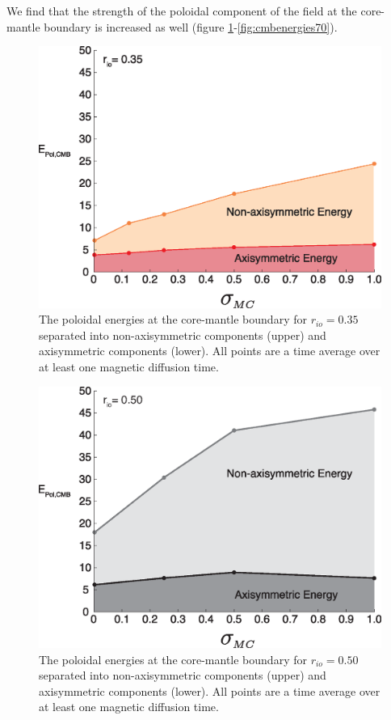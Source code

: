 We find that the strength of the poloidal component of the field at the core-mantle boundary is increased as well (figure \ref{fig:cmbenergies35}-\ref{fig:cmbenergies70}).
\begin{figure}
	\centering
        \includegraphics[width=.7\textwidth]{Chapter3/Figures/f3a.eps}
        \caption{The poloidal energies at the core-mantle boundary for $r_{io}=0.35$ separated into non-axisymmetric components (upper) and axisymmetric components (lower). All points are a time average over at least one magnetic diffusion time.}
        \label{fig:cmbenergies35}
\end{figure}
\begin{figure}
	\centering
        \includegraphics[width=.7\textwidth]{Chapter3/Figures/f3b.eps}
        \caption{The poloidal energies at the core-mantle boundary for $r_{io}=0.50$ separated into non-axisymmetric components (upper) and axisymmetric components (lower). All points are a time average over at least one magnetic diffusion time.}
        \label{fig:cmbenergies50}
\end{figure}
